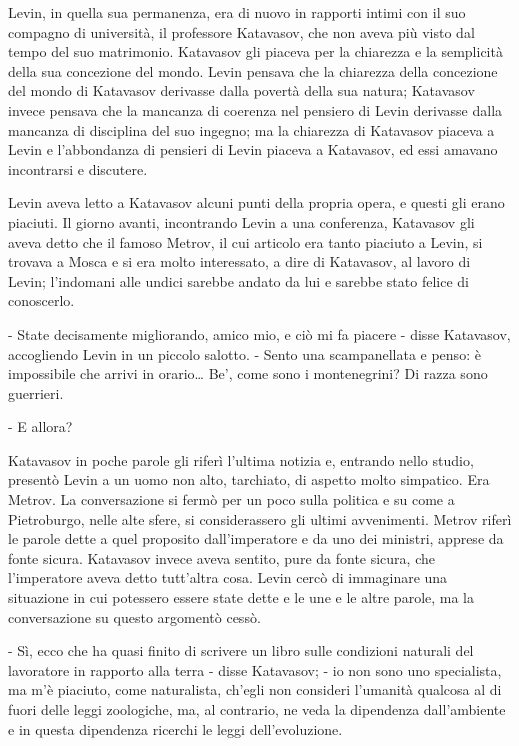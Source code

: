 \label{iii-6} 

Levin, in quella sua permanenza, era di nuovo in rapporti intimi con il suo compagno di università, il professore Katavasov, che non aveva più visto dal tempo del suo matrimonio. Katavasov gli piaceva per la chiarezza e la semplicità della sua concezione del mondo. Levin pensava che la chiarezza della concezione del mondo di Katavasov derivasse dalla povertà della sua natura; Katavasov invece pensava che la mancanza di coerenza nel pensiero di Levin derivasse dalla mancanza di disciplina del suo ingegno; ma la chiarezza di Katavasov piaceva a Levin e l'abbondanza di pensieri di Levin piaceva a Katavasov, ed essi amavano incontrarsi e discutere. 

Levin aveva letto a Katavasov alcuni punti della propria opera, e questi gli erano piaciuti. Il giorno avanti, incontrando Levin a una conferenza, Katavasov gli aveva detto che il famoso Metrov, il cui articolo era tanto piaciuto a Levin, si trovava a Mosca e si era molto interessato, a dire di Katavasov, al lavoro di Levin; l'indomani alle undici sarebbe andato da lui e sarebbe stato felice di conoscerlo. 

- State decisamente migliorando, amico mio, e ciò mi fa piacere - disse Katavasov, accogliendo Levin in un piccolo salotto. - Sento una scampanellata e penso: è impossibile che arrivi in orario\ldots{} Be', come sono i montenegrini? Di razza sono guerrieri. 

- E allora? 

Katavasov in poche parole gli riferì l'ultima notizia e, entrando nello studio, presentò Levin a un uomo non alto, tarchiato, di aspetto molto simpatico. Era Metrov. La conversazione si fermò per un poco sulla politica e su come a Pietroburgo, nelle alte sfere, si considerassero gli ultimi avvenimenti. Metrov riferì le parole dette a quel proposito dall'imperatore e da uno dei ministri, apprese da fonte sicura. Katavasov invece aveva sentito, pure da fonte sicura, che l'imperatore aveva detto tutt'altra cosa. Levin cercò di immaginare una situazione in cui potessero essere state dette e le une e le altre parole, ma la conversazione su questo argomentò cessò. 

- Sì, ecco che ha quasi finito di scrivere un libro sulle condizioni naturali del lavoratore in rapporto alla terra - disse Katavasov; - io non sono uno specialista, ma m'è piaciuto, come naturalista, ch'egli non consideri l'umanità qualcosa al di fuori delle leggi zoologiche, ma, al contrario, ne veda la dipendenza dall'ambiente e in questa dipendenza ricerchi le leggi dell'evoluzione. 

